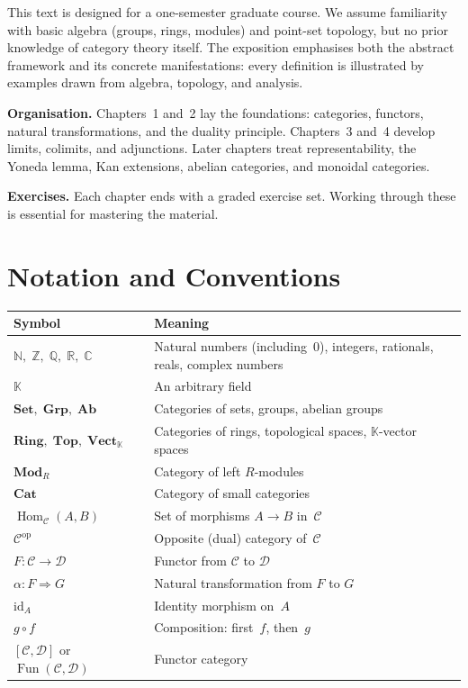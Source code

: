 \documentclass[a4paper,12pt]{book}
\DeclareMathOperator{\Hom}{Hom}
\DeclareMathOperator{\Fun}{Fun}
\newcommand{\Set}{\mathbf{Set}}
\newcommand{\Grp}{\mathbf{Grp}}
\newcommand{\Ab}{\mathbf{Ab}}
\newcommand{\Ring}{\mathbf{Ring}}
\newcommand{\Top}{\mathbf{Top}}
\newcommand{\Vect}{\mathbf{Vect}}
\newcommand{\Mod}{\mathbf{Mod}}
\newcommand{\Cat}{\mathbf{Cat}}
\newcommand{\op}{\mathrm{op}}
\newcommand{\id}{\mathrm{id}}
\newcommand{\N}{\mathbb{N}}
\newcommand{\Z}{\mathbb{Z}}
\newcommand{\Q}{\mathbb{Q}}
\newcommand{\R}{\mathbb{R}}
\newcommand{\C}{\mathbb{C}}
\newcommand{\K}{\mathbb{K}}
\theoremstyle{definition}
\theoremstyle{plain}
\theoremstyle{remark}
\begin{document}
This text is designed for a one-semester graduate course.  We assume
familiarity with basic algebra (groups, rings, modules) and point-set
topology, but no prior knowledge of category theory itself.  The
exposition emphasises both the abstract framework and its concrete
manifestations: every definition is illustrated by examples drawn from
algebra, topology, and analysis.

\medskip
\noindent\textbf{Organisation.}
Chapters~1 and~2 lay the foundations: categories, functors, natural
transformations, and the duality principle.
Chapters~3 and~4 develop limits, colimits, and adjunctions.
Later chapters treat representability, the Yoneda lemma, Kan extensions,
abelian categories, and monoidal categories.

\medskip
\noindent\textbf{Exercises.}
Each chapter ends with a graded exercise set.  Working through these
is essential for mastering the material.

\chapter*{Notation and Conventions}\label{ch:notation}

\begin{longtable}{>{\raggedright}p{4cm} p{9.5cm}}
\toprule
\textbf{Symbol} & \textbf{Meaning} \\
\midrule
\endhead
$\N,\;\Z,\;\Q,\;\R,\;\C$ &
    Natural numbers (including~$0$), integers, rationals, reals,
    complex numbers \\[4pt]
$\K$ &
    An arbitrary field \\[4pt]
$\Set,\;\Grp,\;\Ab$ &
    Categories of sets, groups, abelian groups \\[4pt]
$\Ring,\;\Top,\;\Vect_\K$ &
    Categories of rings, topological spaces,
    $\K$-vector spaces \\[4pt]
$\Mod_R$ &
    Category of left $R$-modules \\[4pt]
$\Cat$ &
    Category of small categories \\[4pt]
$\Hom_\mathcal{C}(A,B)$ &
    Set of morphisms $A\to B$ in~$\mathcal{C}$ \\[4pt]
$\mathcal{C}^{\op}$ &
    Opposite (dual) category of~$\mathcal{C}$ \\[4pt]
$F\colon\mathcal{C}\to\mathcal{D}$ &
    Functor from $\mathcal{C}$ to $\mathcal{D}$ \\[4pt]
$\alpha\colon F\Rightarrow G$ &
    Natural transformation from $F$ to $G$ \\[4pt]
$\id_A$ &
    Identity morphism on~$A$ \\[4pt]
$g\circ f$ &
    Composition: first~$f$, then~$g$ \\[4pt]
$[\mathcal{C},\mathcal{D}]$ or $\Fun(\mathcal{C},\mathcal{D})$ &
    Functor category \\[4pt]
\bottomrule
\end{longtable}
\end{document}
